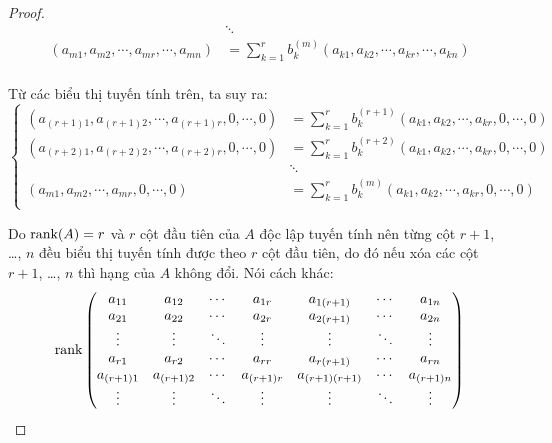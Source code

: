 \documentclass[class=linearalgebra,crop=false]{standalone}
\begin{document}
\begin{proof}
\begin{align*}
                                                                         & \ddots                                                                        \\
        (a_{m1}, a_{m2}, \cdots, a_{mr}, \cdots, a_{mn})                 & = \sum^{r}_{k=1}b_{k}^{(m)}(a_{k1}, a_{k2}, \cdots, a_{kr}, \cdots, a_{kn})   \\
    \end{align*}
    \par Từ các biểu thị tuyến tính trên, ta suy ra:
    \[
        \begin{cases}
            (a_{(r+1)1}, a_{(r+1)2}, \cdots, a_{(r+1)r}, 0, \cdots, 0) & = \sum^{r}_{k=1}b_{k}^{(r+1)}(a_{k1}, a_{k2}, \cdots, a_{kr}, 0, \cdots, 0) \\
            (a_{(r+2)1}, a_{(r+2)2}, \cdots, a_{(r+2)r}, 0, \cdots, 0) & = \sum^{r}_{k=1}b_{k}^{(r+2)}(a_{k1}, a_{k2}, \cdots, a_{kr}, 0, \cdots, 0) \\
                                                                       & \ddots                                                                      \\
            (a_{m1}, a_{m2}, \cdots, a_{mr}, 0, \cdots, 0)             & = \sum^{r}_{k=1}b_{k}^{(m)}(a_{k1}, a_{k2}, \cdots, a_{kr}, 0, \cdots, 0)   \\
        \end{cases}
        \tag{$\star$}
    \]
    \par Do $\text{rank}(A) = r$ và $r$ cột đầu tiên của $A$ độc lập tuyến tính nên từng cột $r+1$, \ldots, $n$ đều biểu thị tuyến tính được theo $r$ cột đầu tiên, do đó nếu xóa các cột $r+1$, \ldots, $n$ thì hạng của $A$ không đổi. Nói cách khác:
    \[
        \text{rank}
        \begin{pmatrix}
            a_{11}     & a_{12}     & \cdots & a_{1r}     & a_{1(r+1)}     & \cdots & a_{1n}     \\
            a_{21}     & a_{22}     & \cdots & a_{2r}     & a_{2(r+1)}     & \cdots & a_{2n}     \\
            \vdots     & \vdots     & \ddots & \vdots     & \vdots         & \ddots & \vdots     \\
            a_{r1}     & a_{r2}     & \cdots & a_{rr}     & a_{r(r+1)}     & \cdots & a_{rn}     \\
            a_{(r+1)1} & a_{(r+1)2} & \cdots & a_{(r+1)r} & a_{(r+1)(r+1)} & \cdots & a_{(r+1)n} \\
            \vdots     & \vdots     & \ddots & \vdots     & \vdots         & \ddots & \vdots     \\

\end{pmatrix}\]
\end{proof}
\end{document}
